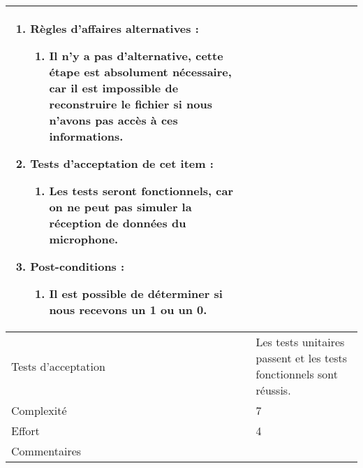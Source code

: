 \begin{longtable}{|l|p{}|}
\begin{enumerate}[label*=\arabic*.]
\begin{enumerate}[label*=\arabic*.]
                                \item Règles d'affaires alternatives :
                                \begin{enumerate}[label*=\arabic*.]
                                    \item Il n'y a pas d'alternative, cette étape est absolument nécessaire, car il est impossible de reconstruire le fichier si nous n'avons pas accès à ces informations.
                                \end{enumerate}
                                \item Tests d'acceptation de cet item :
                                \begin{enumerate}[label*=\arabic*.]
                                    \item Les tests seront fonctionnels, car on ne peut pas simuler la réception de données du microphone.
                                \end{enumerate}
                                \item Post-conditions :
                                \begin{enumerate}[label*=\arabic*.]
                                    \item Il est possible de déterminer si nous recevons un 1 ou un 0.
                                \end{enumerate}
                            \end{enumerate}
        \end{enumerate} \\
\hline
    Tests d'acceptation & Les tests unitaires passent et les tests fonctionnels sont réussis. \\
\hline
    Complexité & 7 \\
\hline
    Effort & 4 \\
\hline
    Commentaires & \\
    
\hline
\end{longtable}
